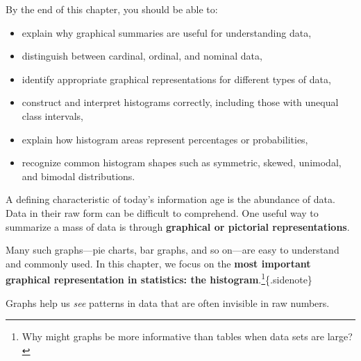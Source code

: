 \documentclass[
  letterpaper,
  DIV=11,
  numbers=noendperiod]{scrreprt}
\providecommand{\tightlist}{%
  \setlength{\itemsep}{0pt}\setlength{\parskip}{0pt}}
\begin{document}
\begin{tcolorbox}[enhanced jigsaw, coltitle=black, colbacktitle=quarto-callout-note-color!10!white, left=2mm, bottomrule=.15mm, bottomtitle=1mm, colback=white, titlerule=0mm, colframe=quarto-callout-note-color-frame, breakable, leftrule=.75mm, toptitle=1mm, opacitybacktitle=0.6, rightrule=.15mm, title=\textcolor{quarto-callout-note-color}{\faInfo}\hspace{0.5em}{Learning objectives}, arc=.35mm, opacityback=0, toprule=.15mm]

By the end of this chapter, you should be able to:

\begin{itemize}
\tightlist
\item
  explain why graphical summaries are useful for understanding data,
\item
  distinguish between cardinal, ordinal, and nominal data,
\item
  identify appropriate graphical representations for different types of
  data,
\item
  construct and interpret histograms correctly, including those with
  unequal class intervals,
\item
  explain how histogram areas represent percentages or probabilities,
\item
  recognize common histogram shapes such as symmetric, skewed, unimodal,
  and bimodal distributions.
\end{itemize}

\end{tcolorbox}

A defining characteristic of today's information age is the abundance of
data. Data in their raw form can be difficult to comprehend. One useful
way to summarize a mass of data is through \textbf{graphical or
pictorial representations}.

Many such graphs---pie charts, bar graphs, and so on---are easy to
understand and commonly used. In this chapter, we focus on the
\textbf{most important graphical representation in statistics: the
histogram}.\footnote{Why might graphs be more informative than tables
  when data sets are large?}\{.sidenote\}

\begin{tcolorbox}[enhanced jigsaw, coltitle=black, colbacktitle=quarto-callout-note-color!10!white, left=2mm, bottomrule=.15mm, bottomtitle=1mm, colback=white, titlerule=0mm, colframe=quarto-callout-note-color-frame, breakable, leftrule=.75mm, toptitle=1mm, opacitybacktitle=0.6, rightrule=.15mm, title=\textcolor{quarto-callout-note-color}{\faInfo}\hspace{0.5em}{Big picture}, arc=.35mm, opacityback=0, toprule=.15mm]

Graphs help us \emph{see} patterns in data that are often invisible in
raw numbers.

\end{tcolorbox}
\end{document}
